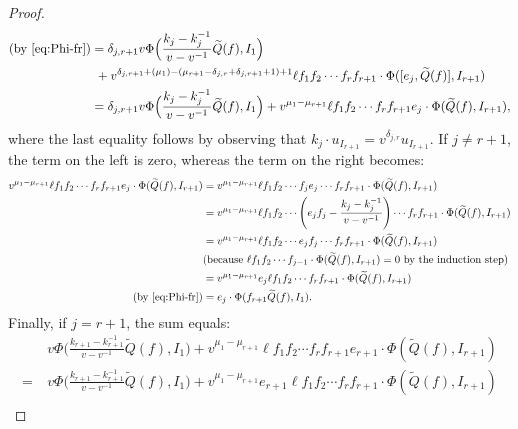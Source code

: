 \documentclass{amsart}
\numberwithin{equation}{section}
\theoremstyle{theorem}
\theoremstyle{definition}
\begin{document}
\begin{proof}
\begin{align*}
\text{(by \eqref{eq:Phi-fr})}&=\delta_{j,r+1}v\Phi\Big(\frac{k_j-k_j^{-1}}{v-v^{-1}}\widetilde Q(f),I_1\Big) \\
&~+ v^{\delta_{j,r+1}+(\mu_1)-(\mu_{r+1}-\delta_{j,r}+\delta_{j,r+1}+1)+1}\ell f_1f_2\cdots f_rf_{r+1}\cdot \Phi([e_j,\widetilde{Q}(f)],I_{r+1})\\
&=\delta_{j,r+1}v\Phi\Big(\frac{k_j-k_j^{-1}}{v-v^{-1}}\widetilde Q(f),I_1\Big) + v^{\mu_1-\mu_{r+1}}\ell f_1f_2\cdots f_rf_{r+1}e_j\cdot\Phi(\widetilde{Q}(f),I_{r+1}),
\end{align*}
where the last equality follows by observing that $k_j\cdot u_{I_{r+1}}=v^{\delta_{j,r}}u_{I_{r+1}}.$ If $j\neq r+1$, the term on the left is zero, whereas the term on the right becomes:
\begin{align*}
v^{\mu_1-\mu_{r+1}}\ell f_1f_2\cdots f_rf_{r+1}e_j\cdot\Phi(\widetilde{Q}(f),I_{r+1})&=v^{\mu_1-\mu_{r+1}}\ell f_1f_2\cdots f_je_j\cdots f_rf_{r+1}\cdot\Phi(\widetilde{Q}(f),I_{r+1})\\
&=v^{\mu_1-\mu_{r+1}}\ell f_1f_2\cdots \left(e_jf_j -\frac{k_j-k_j^{-1}}{v-v^{-1}}\right)\cdots f_rf_{r+1}\cdot\Phi(\widetilde{Q}(f),I_{r+1})\\
&=v^{\mu_1-\mu_{r+1}}\ell f_1f_2\cdots e_jf_j \cdots f_rf_{r+1}\cdot\Phi(\widetilde{Q}(f),I_{r+1})\\
&\text{(because } \ell f_1f_2\cdots f_{j-1}\cdot \Phi(\widetilde{Q}(f),I_{r+1})=0 \text{ by the induction step)}\\
&=v^{\mu_1-\mu_{r+1}}e_j\ell f_1f_2\cdots f_rf_{r+1}\cdot\Phi(\widetilde{Q}(f),I_{r+1})\\
\text{(by \eqref{eq:Phi-fr})}&=e_j\cdot \Phi(f_{r+1} \widetilde{Q}(f),I_{1}).
\end{align*}
Finally, if $j=r+1$, the sum equals:
\begin{align*}
&~v\Phi\Big(\frac{k_{r+1}-k_{r+1}^{-1}}{v-v^{-1}}\widetilde Q(f),I_1\Big) + v^{\mu_1-\mu_{r+1}}\ell f_1f_2\cdots f_rf_{r+1}e_{r+1}\cdot\Phi(\widetilde{Q}(f),I_{r+1})\\
=&~v\Phi\Big(\frac{k_{r+1}-k_{r+1}^{-1}}{v-v^{-1}}\widetilde Q(f),I_1\Big) + v^{\mu_1-\mu_{r+1}}e_{r+1}\ell f_1f_2\cdots f_rf_{r+1}\cdot\Phi(\widetilde{Q}(f),I_{r+1})\\

\end{align*}
\end{proof}
\end{document}
